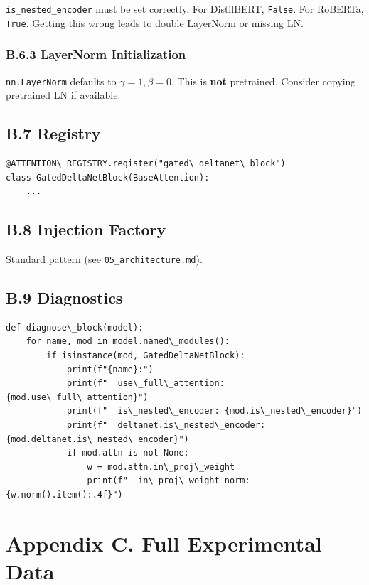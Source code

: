 \texttt{is\_nested\_encoder} must be set correctly. For DistilBERT, \texttt{False}. For 
RoBERTa, \texttt{True}. Getting this wrong leads to double LayerNorm or missing LN.

\subsubsection{B.6.3 LayerNorm Initialization}

\texttt{nn.LayerNorm} defaults to $\gamma = 1, \beta = 0$. This is \textbf{not} 
pretrained. Consider copying pretrained LN if available.

\subsection{B.7 Registry}

\begin{lstlisting}
@ATTENTION\_REGISTRY.register("gated\_deltanet\_block")
class GatedDeltaNetBlock(BaseAttention):
    ...
\end{lstlisting}

\subsection{B.8 Injection Factory}

Standard pattern (see \texttt{05\_architecture.md}).

\subsection{B.9 Diagnostics}

\begin{lstlisting}
def diagnose\_block(model):
    for name, mod in model.named\_modules():
        if isinstance(mod, GatedDeltaNetBlock):
            print(f"{name}:")
            print(f"  use\_full\_attention: {mod.use\_full\_attention}")
            print(f"  is\_nested\_encoder: {mod.is\_nested\_encoder}")
            print(f"  deltanet.is\_nested\_encoder: {mod.deltanet.is\_nested\_encoder}")
            if mod.attn is not None:
                w = mod.attn.in\_proj\_weight
                print(f"  in\_proj\_weight norm: {w.norm().item():.4f}")
\end{lstlisting}




\section{Appendix C. Full Experimental Data}

